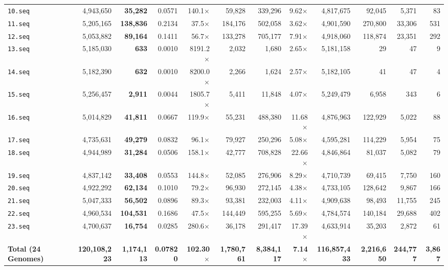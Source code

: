 \documentclass[10pt]{article}
\theoremstyle{definition}
\begin{document}
\begin{table}[h!]
{\begin{tabular}{lrrrrrrrrrrr}
\texttt{10.seq} & 4,943,650 & \textbf{35,282} & 0.0571 & 140.1$\times$ & 59,828 & 339,296 & 9.62$\times$ & 4,817,675 & 92,045 & 5,371 & 83 \\
\texttt{11.seq} & 5,205,165 & \textbf{138,836} & 0.2134 & 37.5$\times$ & 184,176 & 502,058 & 3.62$\times$ & 4,901,590 & 270,800 & 33,306 & 531 \\
\texttt{12.seq} & 5,053,882 & \textbf{89,164} & 0.1411 & 56.7$\times$ & 133,278 & 705,177 & 7.91$\times$ & 4,918,060 & 118,874 & 23,351 & 292 \\
\texttt{13.seq} & 5,185,030 & \textbf{633} & 0.0010 & 8191.2$\times$ & 2,032 & 1,680 & 2.65$\times$ & 5,181,158 & 29 & 47 & 9 \\
\texttt{14.seq} & 5,182,390 & \textbf{632} & 0.0010 & 8200.0$\times$ & 2,266 & 1,624 & 2.57$\times$ & 5,182,105 & 41 & 47 & 4 \\
\texttt{15.seq} & 5,256,457 & \textbf{2,911} & 0.0044 & 1805.7$\times$ & 5,411 & 11,848 & 4.07$\times$ & 5,249,479 & 6,958 & 343 & 6 \\
\texttt{16.seq} & 5,014,829 & \textbf{41,811} & 0.0667 & 119.9$\times$ & 55,231 & 488,380 & 11.68$\times$ & 4,876,963 & 122,929 & 5,022 & 88 \\
\texttt{17.seq} & 4,735,631 & \textbf{49,279} & 0.0832 & 96.1$\times$ & 79,927 & 250,296 & 5.08$\times$ & 4,595,281 & 114,229 & 5,954 & 75 \\
\texttt{18.seq} & 4,944,989 & \textbf{31,284} & 0.0506 & 158.1$\times$ & 42,777 & 708,828 & 22.66$\times$ & 4,846,864 & 81,037 & 5,082 & 79 \\
\texttt{19.seq} & 4,837,142 & \textbf{33,408} & 0.0553 & 144.8$\times$ & 52,085 & 276,906 & 8.29$\times$ & 4,710,739 & 69,415 & 7,750 & 160 \\
\texttt{20.seq} & 4,922,292 & \textbf{62,134} & 0.1010 & 79.2$\times$ & 96,930 & 272,145 & 4.38$\times$ & 4,733,105 & 128,642 & 9,867 & 166 \\
\texttt{21.seq} & 5,047,333 & \textbf{56,502} & 0.0896 & 89.3$\times$ & 93,381 & 232,003 & 4.11$\times$ & 4,909,638 & 98,493 & 11,755 & 245 \\
\texttt{22.seq} & 4,960,534 & \textbf{104,531} & 0.1686 & 47.5$\times$ & 144,449 & 595,255 & 5.69$\times$ & 4,784,574 & 140,184 & 29,688 & 402 \\
\texttt{23.seq} & 4,700,637 & \textbf{16,754} & 0.0285 & 280.6$\times$ & 36,178 & 291,417 & 17.39$\times$ & 4,633,914 & 35,203 & 2,872 & 61 \\
\midrule
\textbf{Total (24 Genomes)} & \textbf{120,108,223} & \textbf{1,174,113} & \textbf{0.07820} & \textbf{102.30$\times$} & \textbf{1,780,761} & \textbf{8,384,117} & \textbf{7.14$\times$} & \textbf{116,857,433} & \textbf{2,216,650} & \textbf{244,777} & \textbf{3,867} \\
\bottomrule
\end{tabular}%
}
\end{table}
\end{document}
